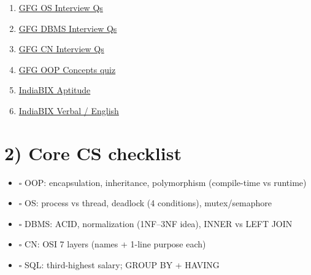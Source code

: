 \documentclass[a4paper,9pt]{extarticle}
\begin{document}
\begin{enumerate}
  \item[\textbf{A}] \href{https://www.geeksforgeeks.org/operating-systems/operating-systems-interview-questions/}{GFG OS Interview Qs}
  \item[\textbf{B}] \href{https://www.geeksforgeeks.org/commonly-asked-dbms-interview-questions/}{GFG DBMS Interview Qs}
  \item[\textbf{C}] \href{https://www.geeksforgeeks.org/computer-networks/computer-networks-interview-questions/}{GFG CN Interview Qs}
  \item[\textbf{D}] \href{https://www.geeksforgeeks.org/quizzes/oop-concepts-gq/}{GFG OOP Concepts quiz}
  \item[\textbf{E}] \href{https://www.indiabix.com/aptitude/questions-and-answers/}{IndiaBIX Aptitude}
  \item[\textbf{F}] \href{https://www.indiabix.com/verbal-ability/questions-and-answers/}{IndiaBIX Verbal / English}
\end{enumerate}

\section{2) Core CS checklist}
\begin{itemize}
  \item $\square$ OOP: encapsulation, inheritance, polymorphism (compile-time vs runtime)
  \item $\square$ OS: process vs thread, deadlock (4 conditions), mutex/semaphore
  \item $\square$ DBMS: ACID, normalization (1NF--3NF idea), INNER vs LEFT JOIN
  \item $\square$ CN: OSI 7 layers (names + 1-line purpose each)
  \item $\square$ SQL: third-highest salary; GROUP BY + HAVING
\end{itemize}
\end{document}
